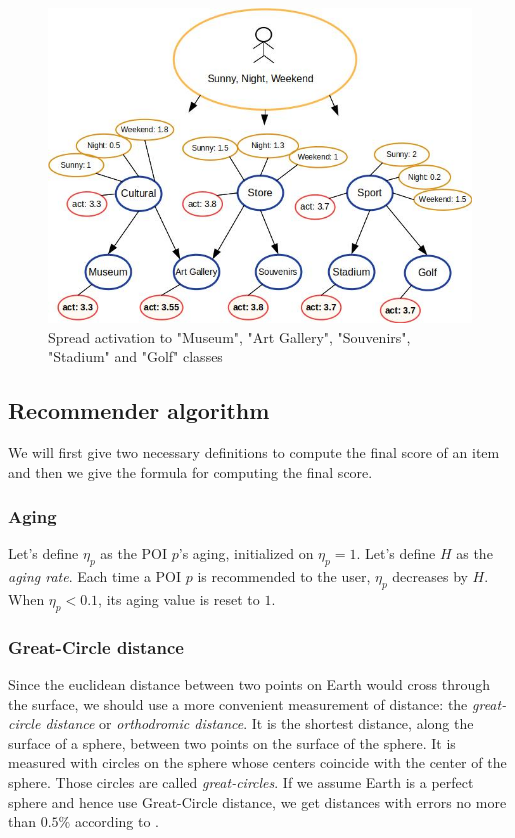 \begin{figure}[h]
\centering
\includegraphics[scale=0.45]{draws/spread_act.jpg}
\caption{Spread activation to "Museum", "Art Gallery", "Souvenirs", "Stadium" and "Golf" classes}
\label{fig:spread_act}
\end{figure}

\subsection{Recommender algorithm}

We will first give two necessary definitions to compute the final score of an item and then we give the formula for computing the final score.

\subsubsection{Aging}

Let's define $\eta_p$ as the POI $p$'s aging, initialized on $\eta_p = 1$. Let's define $H$ as the \textit{aging rate}. Each time a POI $p$ is recommended to the user, $\eta_p$ decreases by $H$. When $\eta_p < 0.1$, its aging value is reset to $1$. 

\subsubsection{Great-Circle distance}
Since the euclidean distance between two points on Earth would cross through the surface, we should use a more convenient measurement of distance: the \textit{great-circle distance} or \textit{orthodromic distance}. It is the shortest distance, along the surface of a sphere, between two points on the surface of the sphere. It is measured with circles on the sphere whose centers coincide with the center of the sphere. Those circles are called \textit{great-circles}. If we assume Earth is a perfect sphere and hence use Great-Circle distance, we get distances with errors no more than $0.5\%$ according to \cite{1997admiralty}. 

